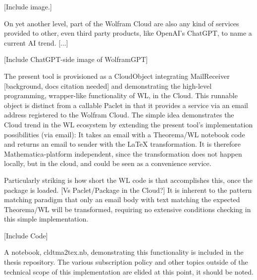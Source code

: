 [Include image.]

On yet another level, part of the Wolfram Cloud are also any kind of services provided to other, even third party products, like OpenAI's ChatGPT, to name a current AI trend. [...]

[Include ChatGPT-side image of WolframGPT]

The present tool is provisioned as a CloudObject integrating MailReceiver [background, docs citation needed] and demonstrating the high-level programming, wrapper-like functionality of WL, in the Cloud. This runnable object is distinct from a callable Paclet in that it provides a service via an email address registered to the Wolfram Cloud. The simple idea demonstrates the Cloud trend in the WL ecosystem by extending the present tool's implementation possibilities (via email): It takes an email with a Theorema/WL notebook code and returns an email to sender with the LaTeX transformation. It is therefore Mathematica-platform independent, since the transformation does not happen locally, but in the cloud, and could be seen as a convenience service.

Particularly striking is how short the WL code is that accomplishes this, once the package is loaded. [Vs Paclet/Package in the Cloud?] It is inherent to the pattern matching paradigm that only an email body with text matching the expected Theorema/WL will be transformed, requiring no extensive conditions checking in this simple implementation.

[Include Code]

A notebook, cldtma2tex.nb, demonstrating this functionality is included in the thesis repository. The various subscription policy and other topics outside of the technical scope of this implementation are elided at this point, it should be noted.